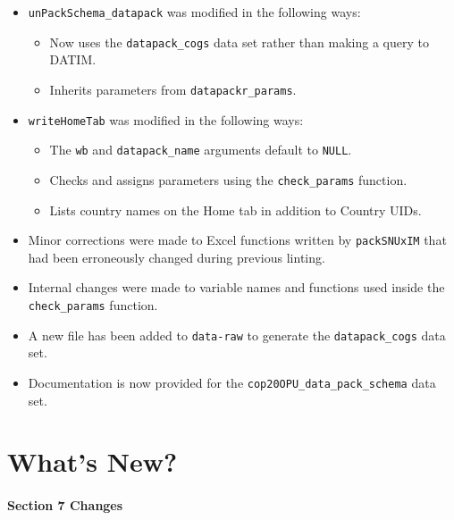 \documentclass[
  openany]{book}
\providecommand{\tightlist}{%
  \setlength{\itemsep}{0pt}\setlength{\parskip}{0pt}}
\begin{document}
\begin{itemize}
\tightlist
\item
  \texttt{unPackSchema\_datapack} was modified in the following ways:

  \begin{itemize}
  \tightlist
  \item
    Now uses the \texttt{datapack\_cogs} data set rather than making a query to DATIM.
  \item
    Inherits parameters from \texttt{datapackr\_params}.
  \end{itemize}
\item
  \texttt{writeHomeTab} was modified in the following ways:

  \begin{itemize}
  \tightlist
  \item
    The \texttt{wb} and \texttt{datapack\_name} arguments default to \texttt{NULL}.
  \item
    Checks and assigns parameters using the \texttt{check\_params} function.
  \item
    Lists country names on the Home tab in addition to Country UIDs.
  \end{itemize}
\item
  Minor corrections were made to Excel functions written by \texttt{packSNUxIM} that
  had been erroneously changed during previous linting.
\item
  Internal changes were made to variable names and functions used inside the
  \texttt{check\_params} function.
\item
  A new file has been added to \texttt{data-raw} to generate the \texttt{datapack\_cogs}
  data set.
\item
  Documentation is now provided for the \texttt{cop20OPU\_data\_pack\_schema} data set.
\end{itemize}

\hypertarget{whats-new}{%
\chapter{What's New?}\label{whats-new}}

\hypertarget{section-7-changes}{%
\subsubsection{Section 7 Changes}\label{section-7-changes}}
\end{document}
